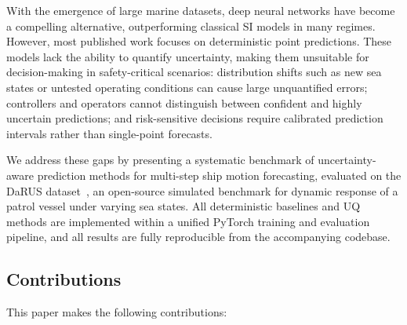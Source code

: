 \documentclass[a4paper,fleqn]{cas-sc}
\begin{document}
With the emergence of large marine datasets, deep neural networks have become a compelling alternative, outperforming classical SI models in many regimes. However, most published work focuses on deterministic point predictions. These models lack the ability to quantify uncertainty, making them unsuitable for decision-making in safety-critical scenarios: distribution shifts such as new sea states or untested operating conditions can cause large unquantified errors; controllers and operators cannot distinguish between confident and highly uncertain predictions; and risk-sensitive decisions require calibrated prediction intervals rather than single-point forecasts.

We address these gaps by presenting a systematic benchmark of uncertainty-aware prediction methods for multi-step ship motion forecasting, evaluated on the DaRUS dataset~\cite{baier2022darus}, an open-source simulated benchmark for dynamic response of a patrol vessel under varying sea states. All deterministic baselines and UQ methods are implemented within a unified PyTorch training and evaluation pipeline, and all results are fully reproducible from the accompanying codebase.

\subsection*{Contributions}

This paper makes the following contributions:
\end{document}
